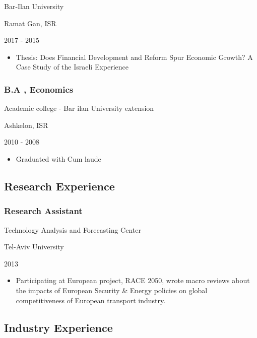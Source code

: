 \documentclass[]{article}
\providecommand{\tightlist}{%
  \setlength{\itemsep}{0pt}\setlength{\parskip}{0pt}}
\begin{document}
Bar-Ilan University

Ramat Gan, ISR

2017 - 2015

\begin{itemize}
\tightlist
\item
  Thesis: Does Financial Development and Reform Spur Economic Growth? A
  Case Study of the Israeli Experience
\end{itemize}

\hypertarget{b.a-economics}{%
\subsubsection{B.A , Economics}\label{b.a-economics}}

Academic college - Bar ilan University extension

Ashkelon, ISR

2010 - 2008

\begin{itemize}
\tightlist
\item
  Graduated with Cum laude
\end{itemize}

\hypertarget{research-experience}{%
\subsection{Research Experience}\label{research-experience}}

\hypertarget{research-assistant}{%
\subsubsection{Research Assistant}\label{research-assistant}}

Technology Analysis and Forecasting Center

Tel-Aviv University

2013

\begin{itemize}
\tightlist
\item
  Participating at European project, RACE 2050, wrote macro reviews
  about the impacts of European Security \& Energy policies on global
  competitiveness of European transport industry.
\end{itemize}

\hypertarget{industry-experience}{%
\subsection{Industry Experience}\label{industry-experience}}
\end{document}
